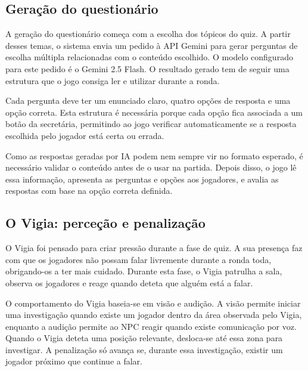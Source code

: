 \subsection{Geração do questionário}
\label{subsec:geracaoQuestionario}

A geração do questionário começa com a escolha dos tópicos do quiz. A partir desses temas, o sistema envia um pedido à API Gemini \cite{GoogleDeepMind2025} para gerar perguntas de escolha múltipla relacionadas com o conteúdo escolhido. O modelo configurado para este pedido é o Gemini 2.5 Flash. O resultado gerado tem de seguir uma estrutura que o jogo consiga ler e utilizar durante a ronda.

Cada pergunta deve ter um enunciado claro, quatro opções de resposta e uma opção correta. Esta estrutura é necessária porque cada opção fica associada a um botão da secretária, permitindo ao jogo verificar automaticamente se a resposta escolhida pelo jogador está certa ou errada.

Como as respostas geradas por IA podem nem sempre vir no formato esperado, é necessário validar o conteúdo antes de o usar na partida. Depois disso, o jogo lê essa informação, apresenta as perguntas e opções aos jogadores, e avalia as respostas com base na opção correta definida.


\subsection{O Vigia: perceção e penalização}
\label{subsec:vigia}

O Vigia foi pensado para criar pressão durante a fase de quiz. A sua presença faz com que os jogadores não possam falar livremente durante a ronda toda, obrigando-os a ter mais cuidado. Durante esta fase, o Vigia patrulha a sala, observa os jogadores e reage quando deteta que alguém está a falar.

O comportamento do Vigia baseia-se em visão e audição. A visão permite iniciar uma investigação quando existe um jogador dentro da área observada pelo Vigia, enquanto a audição permite ao NPC reagir quando existe comunicação por voz. Quando o Vigia deteta uma posição relevante, desloca-se até essa zona para investigar. A penalização só avança se, durante essa investigação, existir um jogador próximo que continue a falar.

